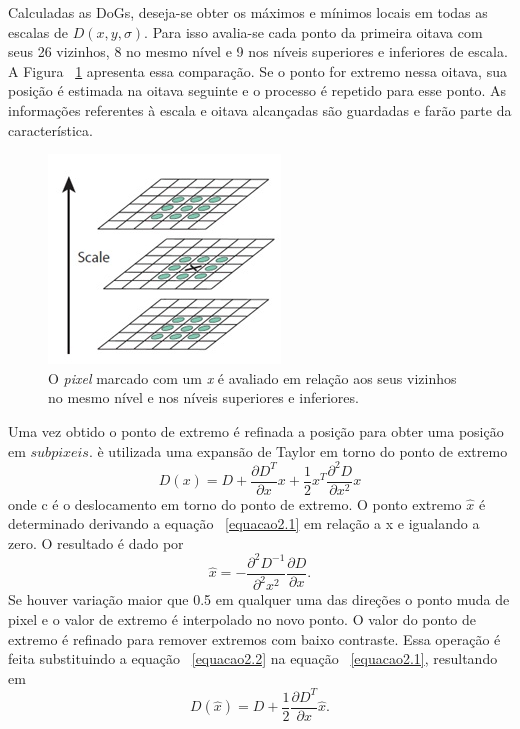 Calculadas as DoGs, deseja-se obter os máximos e mínimos locais em todas as escalas de $\textit{D}(x,y,\sigma)$. Para isso avalia-se cada ponto da primeira oitava com seus 26 vizinhos, 8 no mesmo nível e 9 nos níveis superiores e inferiores de escala. A Figura ~\ref{fig:pixelcamadas} apresenta essa comparação. Se o ponto for extremo nessa oitava, sua posição é estimada na oitava seguinte e o processo é repetido para esse ponto. As informações referentes à escala e oitava alcançadas são guardadas e farão parte da característica. 


\begin{figure}[h!]
	\centering
	\includegraphics[width=0.5\linewidth]{figures/pixelCamadas}
	\caption{O \textit{pixel} marcado com um \textit{x} é avaliado em relação aos seus vizinhos no mesmo nível e nos níveis superiores e inferiores. \cite{VisualOdometryRodasVehicles}}
	\label{fig:pixelcamadas}
\end{figure}

Uma vez obtido o ponto de extremo é refinada a posição para obter uma posição em $\textit{subpixeis}$. è utilizada uma expansão de Taylor em torno do ponto de extremo \begin{equation}\label{equacao2.1}
D(x) = D + \frac{\partial D^T}{\partial x}x + \frac{1}{2}x^T\frac{\partial^2D}{\partial x^2}x
\end{equation} onde c é o deslocamento em torno do ponto de extremo. O ponto extremo $\hat{x}$ é determinado derivando a equação ~\ref{equacao2.1} em relação a x e igualando a zero. O resultado é dado por \begin{equation}\label{equacao2.2}
\hat{x} = -\frac{\partial^2D^{-1}}{\partial^2x^2}\frac{\partial D}{\partial x}. 
\end{equation} 
Se houver variação maior que 0.5 em qualquer uma das direções o ponto muda de pixel e o valor de extremo é interpolado no novo ponto. O valor do ponto de extremo é refinado para remover extremos com baixo contraste. Essa operação é feita substituindo a equação ~\ref{equacao2.2} na equação ~\ref{equacao2.1}, resultando em \[ D( \hat{x} ) = D + \frac{1}{2}\frac{\partial D^T}{\partial x} \hat{x} . \]

